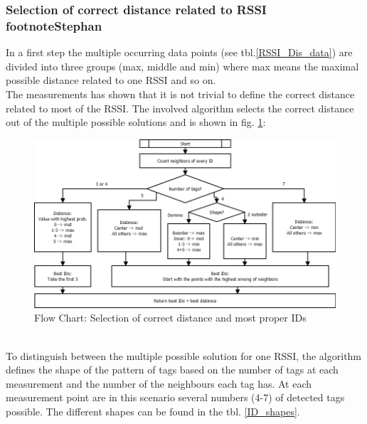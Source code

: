 \subsubsection[Selection of correct distance related to RSSI]{Selection of correct distance related to RSSI footnote{Stephan}}
In a first step the multiple occurring data points (see tbl.\ref{RSSI_Dis_data}) are divided into three groups (max, middle and min) where max means the maximal possible distance related to one RSSI and so on.\\ 
The measurements has shown that it is not trivial to define the correct distance related to most of the RSSI. The involved algorithm selects the correct distance out of the multiple possible solutions and is shown in fig. \ref{BestID}:\\
\begin{figure}[!htbp]
\centering
\includegraphics[width = 16cm]{Pictures/BestIDs}
\caption{Flow Chart: Selection of correct distance and most proper IDs}
\label{BestID}
\end{figure}\\
To distinguish between the multiple possible solution for one RSSI, the algorithm defines the shape of the pattern of tags based on the number of tags at each measurement and the number of the neighbours each tag has. At each measurement point are in this scenario several numbers (4-7) of detected tags possible. The different shapes can be found in the tbl. \ref{ID_shapes}.\\
